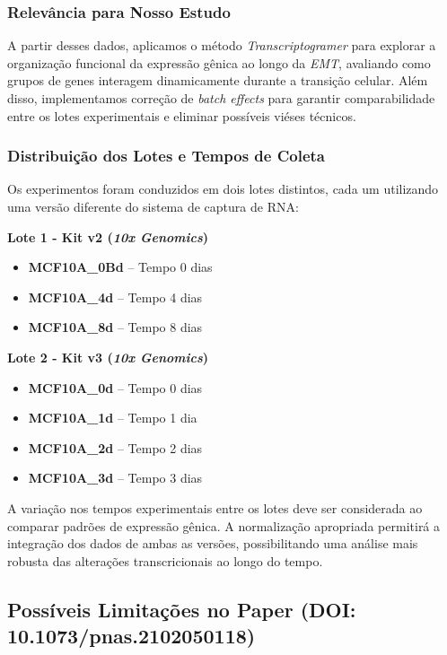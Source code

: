 \documentclass[12pt]{article}
\begin{document}
\subsubsection{Relevância para Nosso Estudo}

A partir desses dados, aplicamos o método \textit{Transcriptogramer} para explorar a organização funcional da expressão gênica ao longo da \textit{EMT}, avaliando como grupos de genes interagem dinamicamente durante a transição celular. Além disso, implementamos correção de \textit{batch effects} para garantir comparabilidade entre os lotes experimentais e eliminar possíveis viéses técnicos.


\subsubsection{Distribuição dos Lotes e Tempos de Coleta}

Os experimentos foram conduzidos em dois lotes distintos, cada um utilizando uma versão diferente do sistema de captura de RNA:

\textbf{Lote 1 - Kit v2 (\textit{10x Genomics})}
\begin{itemize}
    \item \textbf{MCF10A\_0Bd} – Tempo 0 dias
    \item \textbf{MCF10A\_4d} – Tempo 4 dias
    \item \textbf{MCF10A\_8d} – Tempo 8 dias
\end{itemize}

\textbf{Lote 2 - Kit v3 (\textit{10x Genomics})}
\begin{itemize}
    \item \textbf{MCF10A\_0d} – Tempo 0 dias
    \item \textbf{MCF10A\_1d} – Tempo 1 dia
    \item \textbf{MCF10A\_2d} – Tempo 2 dias
    \item \textbf{MCF10A\_3d} – Tempo 3 dias
\end{itemize}

A variação nos tempos experimentais entre os lotes deve ser considerada ao comparar padrões de expressão gênica. A normalização apropriada permitirá a integração dos dados de ambas as versões, possibilitando uma análise mais robusta das alterações transcricionais ao longo do tempo.

\subsection{Possíveis Limitações no Paper (\textbf{DOI: 10.1073/pnas.2102050118})}
\end{document}
